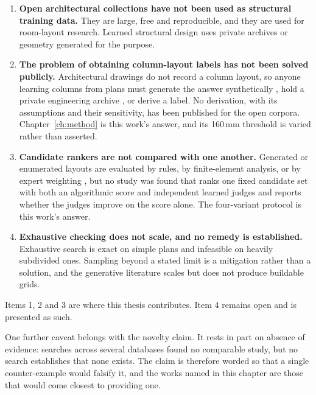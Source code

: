 \begin{enumerate}
\item \textbf{Open architectural collections have not been used as
structural training data.} They are large, free and reproducible, and they
are used for room-layout research. Learned structural design uses private
archives or geometry generated for the purpose.

\item \textbf{The problem of obtaining column-layout labels has not been
solved publicly.} Architectural drawings do not record a column layout, so
anyone learning columns from plans must generate the answer synthetically
\citep{ampanavos2021approxiframer}, hold a private engineering archive
\citep{pizarro2021walls}, or derive a label. No derivation, with its
assumptions and their sensitivity, has been published for the open
corpora. Chapter~\ref{ch:method} is this work's answer, and its 160\,mm
threshold is varied rather than asserted.

\item \textbf{Candidate rankers are not compared with one another.}
Generated or enumerated layouts are evaluated by rules, by finite-element
analysis, or by expert weighting \citep{wang2025experteval}, but no study
was found that ranks one fixed candidate set with both an algorithmic
score and independent learned judges and reports whether the judges
improve on the score alone. The four-variant protocol is this work's
answer.

\item \textbf{Exhaustive checking does not scale, and no remedy is
established.} Exhaustive search is exact on simple plans and infeasible on
heavily subdivided ones. Sampling beyond a stated limit is a mitigation
rather than a solution, and the generative literature scales but does not
produce buildable grids.
\end{enumerate}

Items 1, 2 and 3 are where this thesis contributes. Item 4 remains open
and is presented as such.

One further caveat belongs with the novelty claim. It rests in part on
absence of evidence: searches across several databases found no comparable
study, but no search establishes that none exists. The claim is therefore
worded so that a single counter-example would falsify it, and the works
named in this chapter are those that would come closest to providing one.
